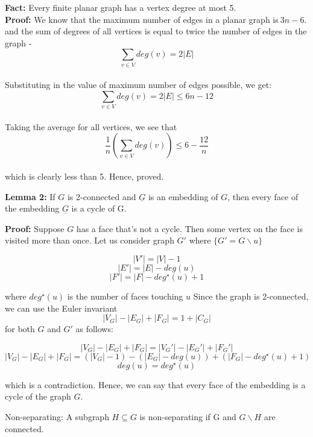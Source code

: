 \documentclass{article}
\begin{document}
\textbf{Fact: } Every finite planar graph has a vertex degree at most 5.\\
\textbf{Proof: }We know that the maximum number of edges in a planar graph is$\ {3n-6}$. and the sum of degrees of all vertices is equal to twice the number of edges in the graph - \\ $$\sum_{v \in V} deg(v) = 2|E|$$ \\ Substituting in the value of maximum number of edges possible, we get: $$\sum_{v \in V} deg(v) = 2|E| \leq 6n-12 $$ \\
Taking the average for all vertices, we see that 
$$\frac{1}{n}(\sum_{v \in V} deg(v)) \leq 6 - \frac{12}{n} $$ \\
which is clearly less than 5. Hence, proved.

\vspace{5mm}

\textbf{Lemma 2: }If ${G}$ is 2-connected and ${\underline{G}}$ is an embedding of ${G}$, then every face of the embedding ${\underline{G}}$ is a cycle of G.

\textbf{Proof: } Suppose ${G}$ has a face that's not a cycle. Then some vertex on the face is visited more than once.
\newline Let us consider graph ${G'}$ where ${ \{ G' = G \backslash u\} }$
\begin{center}
    $$|V'| = |V| - 1$$
    $$|E'| = |E| - deg(u)$$
    $$|F'| = |F| - deg^{\star}(u) + 1$$ 
\end{center}
where ${deg^{\star}(u)}$ is the number of faces touching ${u}$ 
\newline Since the graph is 2-connected, we can use the Euler invariant $$|V_G| - |E_G| + |F_G| = 1 + |C_G|$$ for both ${G}$ and ${G'}$ as follows:\\
\begin{center}
    $$|V_G| - |E_G| + |F_G| = |V_G'| - |E_G'| + |F_G'|$$
    $$|V_G| - |E_G| + |F_G| = (|V_G| - 1) - (|E_G| - deg(u)) + (|F_G| - deg^{\star}(u)+1)$$
    $$deg(u) = deg^{\star}(u)$$
\end{center}
which is a contradiction. Hence, we can say that every face of the embedding is a cycle of the graph ${G}$.

\begin{definition}{Non-separating: }
A subgraph $H \subseteq G$ is non-separating if G and $G \backslash H$ are connected.
\end{definition}
\end{document}
